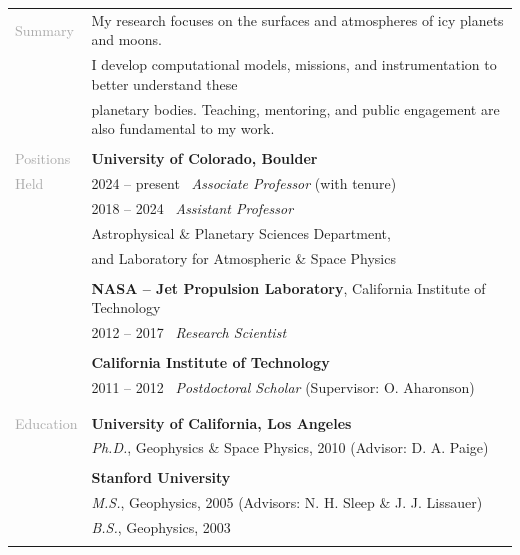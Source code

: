 \documentclass[letterpaper,10pt,twoside]{article}
\begin{document}
\vspace{0.05in}
\noindent \begin{tabular}{@{} l l}
 \large{\textcolor{darkgray}{Summary}} 
    & \small{My research focuses on the surfaces and atmospheres of icy planets and moons.} \\
    & \small{I develop computational models, missions, and instrumentation to better understand these } \\ 
    & \small{planetary bodies. Teaching, mentoring, and public engagement are also fundamental to my work.}\\
     & \\
 \large{\textcolor{darkgray}{Positions}}    & \textbf{University of Colorado, Boulder} \\
 \large{\textcolor{darkgray}{Held}}    & 2024 -- present~ 
 \textit{Associate Professor} (with tenure) \\
     & 2018 -- 2024~ \textit{Assistant Professor}\\
     & \hspace{0.25in} Astrophysical \& Planetary Sciences Department, \\
     & \hspace{0.25in} and Laboratory for Atmospheric \& Space Physics \\
     & \\
     & \textbf{NASA -- Jet Propulsion Laboratory}, California Institute of Technology \\
     & 2012 -- 2017~ \textit{Research Scientist} \\
     & \\
     & \textbf{California Institute of Technology} \\
     & 2011 -- 2012~ \textit{Postdoctoral Scholar} (Supervisor: O. Aharonson) \\
     & \\
     & \\
 \large{\textcolor{darkgray}{Education}}    & \textbf{University of California, Los Angeles} \\
     & \textit{Ph.D.}, Geophysics \& Space Physics, 2010 (Advisor: D. A. Paige) \\
     & \\
     & \textbf{Stanford University} \\
     & \textit{M.S.}, Geophysics, 2005 (Advisors: N. H. Sleep \& J. J. Lissauer) \\
     & \textit{B.S.}, Geophysics, 2003 \\
     & \\

\end{tabular}
\end{document}
